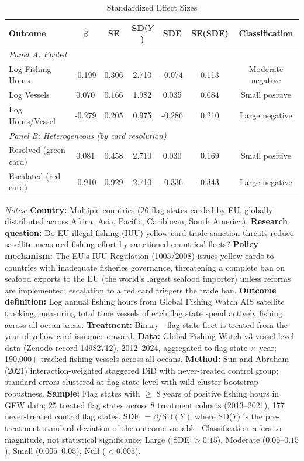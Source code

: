\begin{table}[t]
\centering
\caption{Standardized Effect Sizes}
\label{tab:sde}
\begin{threeparttable}
\begin{tabular}{lcccccc}
\toprule
Outcome & $\hat{\beta}$ & SE & SD($Y$) & SDE & SE(SDE) & Classification \\
\midrule
\multicolumn{7}{l}{\textit{Panel A: Pooled}} \\[3pt]
Log Fishing Hours & -0.199 & 0.306 & 2.710 & -0.074 & 0.113 & Moderate negative \\
Log Vessels & 0.070 & 0.166 & 1.982 & 0.035 & 0.084 & Small positive \\
Log Hours/Vessel & -0.279 & 0.205 & 0.975 & -0.286 & 0.210 & Large negative \\
\midrule
\multicolumn{7}{l}{\textit{Panel B: Heterogeneous (by card resolution)}} \\[3pt]
Resolved (green card) & 0.081 & 0.458 & 2.710 & 0.030 & 0.169 & Small positive \\
Escalated (red card) & -0.910 & 0.929 & 2.710 & -0.336 & 0.343 & Large negative \\
\bottomrule
\end{tabular}
\begin{tablenotes}[flushleft]
\small
\item \textit{Notes:} \textbf{Country:} Multiple countries (26 flag states carded by EU, globally distributed across Africa, Asia, Pacific, Caribbean, South America). \textbf{Research question:} Do EU illegal fishing (IUU) yellow card trade-sanction threats reduce satellite-measured fishing effort by sanctioned countries' fleets? \textbf{Policy mechanism:} The EU's IUU Regulation (1005/2008) issues yellow cards to countries with inadequate fisheries governance, threatening a complete ban on seafood exports to the EU (the world's largest seafood importer) unless reforms are implemented; escalation to a red card triggers the trade ban. \textbf{Outcome definition:} Log annual fishing hours from Global Fishing Watch AIS satellite tracking, measuring total time vessels of each flag state spend actively fishing across all ocean areas. \textbf{Treatment:} Binary---flag-state fleet is treated from the year of yellow card issuance onward. \textbf{Data:} Global Fishing Watch v3 vessel-level data (Zenodo record 14982712), 2012--2024, aggregated to flag state $\times$ year; 190,000+ tracked fishing vessels across all oceans. \textbf{Method:} Sun and Abraham (2021) interaction-weighted staggered DiD with never-treated control group; standard errors clustered at flag-state level with wild cluster bootstrap robustness. \textbf{Sample:} Flag states with $\geq$ 8 years of positive fishing hours in GFW data; 25 treated flag states across 8 treatment cohorts (2013--2021), 177 never-treated control flag states. SDE $= \hat{\beta} / \text{SD}(Y)$ where SD($Y$) is the pre-treatment standard deviation of the outcome variable. Classification refers to magnitude, not statistical significance: Large ($|$SDE$| > 0.15$), Moderate ($0.05$--$0.15$), Small ($0.005$--$0.05$), Null ($< 0.005$).
\end{tablenotes}
\end{threeparttable}
\end{table}
